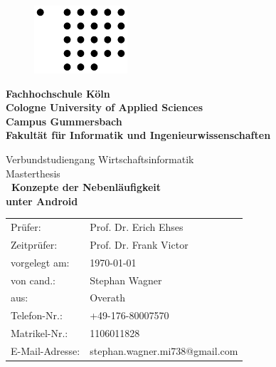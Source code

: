 \documentclass[12pt,oneside,a4paper,bibtotoc,liststotoc]{scrreprt}
\begin{document}
\begin{titlepage} 
\begin{figure}[H]
  \begin{flushright}
    \includegraphics{img/fh-koeln-logo.png}
    \label{logo_fh_köln}
  \end{flushright}
\end{figure}

\begin{center}
\textbf{\Large\newline  Fachhochschule Köln\\
Cologne University of Applied Sciences\\[0.1cm]
\normalsize Campus Gummersbach\\
Fakultät für Informatik und Ingenieurwissenschaften\\[0.5cm]}

 
\Large Verbundstudiengang Wirtschaftsinformatik\\[0.5cm]

\large Masterthesis\\[0.1cm]
  
{ \huge \bfseries \ Konzepte der Nebenläufigkeit  \\[0.1cm]
        unter Android \\[0.5cm]
        
}
\vfill

\begin{table}[h]
\centering
\begin{tabular}{ll}
  Prüfer:         & Prof. Dr. Erich Ehses \\
  Zeitprüfer:     & Prof. Dr. Frank Victor \\
  vorgelegt am:   & \today \\
  von cand.:      & Stephan Wagner \\
  aus:            & Overath \\
  Telefon-Nr.:    & +49-176-80007570 \\
  Matrikel-Nr.:   & 1106011828 \\
  E-Mail-Adresse: & stephan.wagner.mi738@gmail.com
\end{tabular}
\end{table}
\end{center}
\end{titlepage}
\end{document}

